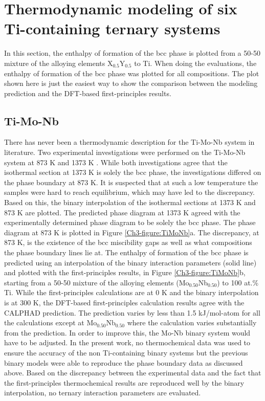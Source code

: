 \section{Thermodynamic modeling of six Ti-containing ternary systems}

In this section, the enthalpy of formation of the bcc phase is plotted from a 50-50 mixture of the alloying elements X$_{0.5}$Y$_{0.5}$ to Ti. When doing the evaluations, the enthalpy of formation of the bcc phase was plotted for all compositions. The plot shown here is just the easiest way to show the comparison between the modeling prediction and the DFT-based first-principles results.

\subsection{Ti-Mo-Nb}

There has never been a thermodynamic description for the Ti-Mo-Nb system in literature. Two experimental investigations were performed on the Ti-Mo-Nb system at 873 K and 1373 K \cite{English1961,Prokoshkin1967}. While both investigations agree that the isothermal section at 1373 K is solely the bcc phase, the investigations differed on the phase boundary at 873 K. It is suspected that at such a low temperature the samples were hard to reach equilibrium, which may have led to the discrepancy. Based on this, the binary interpolation of the isothermal sections at 1373 K and 873 K are plotted. The predicted phase diagram at 1373 K agreed with the experimentally determined phase diagram to be solely the bcc phase. The phase diagram at 873 K is plotted in Figure \ref{Ch3-figure:TiMoNb}a. The discrepancy, at 873 K, is the existence of the bcc miscibility gaps as well as what compositions the phase boundary lines lie at. The enthalpy of formation of the bcc phase is predicted using an interpolation of the binary interaction parameters (solid line) and plotted with the first-principles results, in Figure \ref{Ch3-figure:TiMoNb}b, starting from a 50-50 mixture of the alloying elements (Mo$_{0.50}$Nb$_{0.50}$) to 100 at.\% Ti. While the first-principles calculations are at 0 K and the binary interpolation is at 300 K, the DFT-based first-principles calculation results agree with the CALPHAD prediction. The prediction varies by less than 1.5 kJ/mol-atom for all the calculations except at Mo$_{0.50}$Nb$_{0.50}$ where the calculation varies substantially from the prediction. In order to improve this, the Mo-Nb binary system would have to be adjusted. In the present work, no thermochemical data was used to ensure the accuracy of the non Ti-containing binary systems but the previous binary models were able to reproduce the phase boundary data as discussed above. Based on the discrepancy between the experimental data and the fact that the first-principles thermochemical results are reproduced well by the binary interpolation, no ternary interaction parameters are evaluated. 


